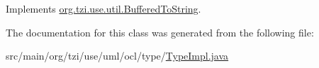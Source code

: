 Implements \hyperlink{interfaceorg_1_1tzi_1_1use_1_1util_1_1_buffered_to_string_aea95e4e53b18818d50ee253700e6e2d5}{org.\-tzi.\-use.\-util.\-Buffered\-To\-String}.



The documentation for this class was generated from the following file\-:\begin{DoxyCompactItemize}
\item 
src/main/org/tzi/use/uml/ocl/type/\hyperlink{_type_impl_8java}{Type\-Impl.\-java}\end{DoxyCompactItemize}
